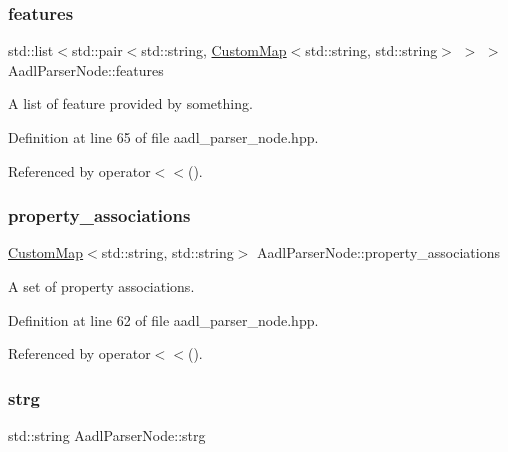 \subsubsection{\texorpdfstring{features}{features}}
{\footnotesize\ttfamily std\+::list$<$std\+::pair$<$std\+::string, \hyperlink{custom__map_8hpp_a18ca01763abbe3e5623223bfe5aaac6b}{Custom\+Map}$<$std\+::string, std\+::string$>$ $>$ $>$ Aadl\+Parser\+Node\+::features}



A list of feature provided by something. 



Definition at line 65 of file aadl\+\_\+parser\+\_\+node.\+hpp.



Referenced by operator$<$$<$().

\mbox{\label{structAadlParserNode_a2b91ce4340afee28bf9f24338ff42d55}} 
\subsubsection{\texorpdfstring{property\+\_\+associations}{property\_associations}}
{\footnotesize\ttfamily \hyperlink{custom__map_8hpp_a18ca01763abbe3e5623223bfe5aaac6b}{Custom\+Map}$<$std\+::string, std\+::string$>$ Aadl\+Parser\+Node\+::property\+\_\+associations}



A set of property associations. 



Definition at line 62 of file aadl\+\_\+parser\+\_\+node.\+hpp.



Referenced by operator$<$$<$().

\mbox{\label{structAadlParserNode_a1818540477de82becd8229345b908343}} 
\subsubsection{\texorpdfstring{strg}{strg}}
{\footnotesize\ttfamily std\+::string Aadl\+Parser\+Node\+::strg}



